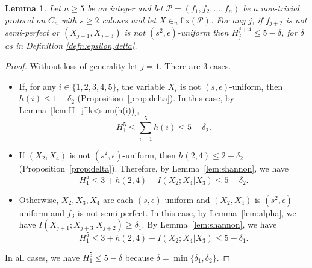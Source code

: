 \documentclass{birkjour}
\newtheorem{lem}[thm]{Lemma}
\theoremstyle{indenteddefinition}
\theoremstyle{indenteddefinition}
\numberwithin{equation}{section}
\renewcommand{\Pr}{\mathcal{P}}
\newcommand{\fix}{\mbox{fix}}
\begin{document}
\begin{lem}
\label{lem:one_non-semi-perfect_function}
Let $n \geq 5$ be an integer and let $\Pr = (f_1,f_2, \ldots ,f_n)$ be a non-trivial protocal on $C_n$ with $s \geq 2$ colours and let $X\in_u \fix(\Pr)$. For any $j$, if $f_{j+2}$ is not semi-perfect or $(X_{j+1},X_{j+3})$ is not $(s^2,\epsilon)$-uniform then $H_j^{j+4} \leq 5 - \delta$, for $\delta$ as in Definition \ref{defn:epsilon,delta}. 
\end{lem}
\begin{proof}
Without loss of generality let $j=1$. There are $3$ cases.
\begin{itemize}
\item If, for any $i \in \{ 1,2,3,4,5 \}$, the variable $X_i$ is not $(s,\epsilon)$-uniform, then $h(i) \leq 1 - \delta_2$ (Proposition~\ref{prop:delta}). In this case, by Lemma~\ref{lem:H_j^k<sum(h(i))},
	$$ H_1^5 \leq \sum_{i=1}^5 h(i) \leq 5 - \delta_2. $$
\item If $(X_2,X_4)$ is not $(s^2,\epsilon)$-uniform, then $h(2,4) \leq 2-\delta_2$ (Proposition~\ref{prop:delta}). Therefore, by Lemma~\ref{lem:shannon}, we have 
	$$ H_1^5 \leq 3 + h(2,4) - I(X_2;X_4|X_3) \leq 5-\delta_2. $$
\item Otherwise, $X_2,X_3,X_4$ are each $(s,\epsilon)$-uniform and $(X_2,X_4)$ is $(s^2,\epsilon)$-uniform and $f_3$ is not semi-perfect. In this case, by Lemma~\ref{lem:alpha}, we have $I(X_{j+1};X_{j+3}|X_{j+2}) \geq \delta_1$. By Lemma~\ref{lem:shannon}, we have 
	$$ H_1^5 \leq 3 + h(2,4) - I(X_2;X_4|X_3) \leq 5-\delta_1. $$
\end{itemize}
In all cases, we have $H_1^5 \leq 5 - \delta$ because $\delta = \min\{ \delta_1 , \delta_2 \}$.
\end{proof}
\end{document}
